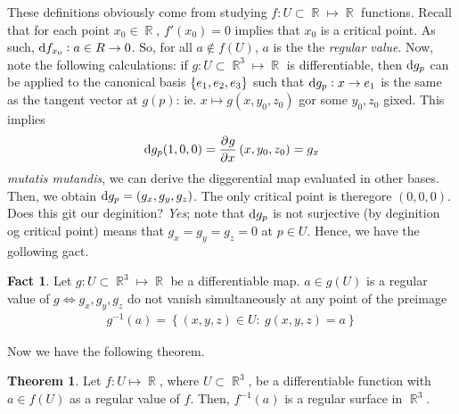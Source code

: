 \documentclass{amsart} %
\theoremstyle{mytheoremstyle}
\theoremstyle{definition}
\newtheorem{theorem}[definition]{Theorem}
\newtheorem{fact}[definition]{Fact}
\numberwithin{equation}{section}
\DeclareMathOperator{\R}{\mathbb{R}}
\DeclareMathOperator{\1}{\mathbbm{1}}
\DeclareMathOperator{\D}{\dif}
\newcommand{\condset}[4]{\left\{ #1  : \: #2 #3 #4 \right\}}
\begin{document}
These definitions obviously come from studying $f: U \subset \R \mapsto \R$ functions. Recall that for each point $x_0 \in \R$, $f'(x_0)=0$ implies that $x_0$ is a critical point. As such, $\D f_{x_0} : a \in R \to 0$. So, for all $a \notin f(U)$, $a$ is the the \textit{regular value}. Now, note the following calculations: if $g: U \subset \R^3 \mapsto \R$ is differentiable, then $\D g_p$ can be applied to the canonical basis $\set{e_1,e_2,e_3}$ such that $\D g_p: x \to e_1$ is the same as the tangent vector at $g(p)$: ie. $x \mapsto g(x,y_0,z_0)$ gor some $y_0,z_0$ gixed. This implies 
\begin{align*}
\D g_{p} (1,0,0) = \dpd{g}{x} (x,y_0,z_0) = g_x
\end{align*}
\textit{mutatis mutandis}, we can derive the diggerential map evaluated in other bases. Then, we obtain $\D g_p = (g_x,g_y,g_z)$. The only critical point is theregore $(0,0,0)$. Does this git our deginition? \textit{Yes}; note that $\D g_p$ is not surjective (by deginition og critical point) means that $g_x=g_y=g_z = 0$ at $p \in U$. Hence, we have the gollowing gact.

\begin{fact}
	\label{factregularvaluecharacterisation}
	Let $g: U \subset \R^3 \mapsto \R$ be a differentiable map. $a \in g(U)$ is a regular value of $g \iff g_x,g_y,g_z$ do not vanish simultaneously at any point of the preimage
	\begin{align}
	\label{eqfactregularvaluecharacterisation}
	g^{-1} (a) = \condset{(x,y,z) \in U}{g(x,y,z)}{=}{a}
	\end{align} 
\end{fact}

\noindent Now we have the following theorem.

\begin{theorem}
	\label{thmcontinuousfunctionpreimageasregularsurface}
	Let $f: U \mapsto \R$, where $U \subset \R^3$, be a differentiable function with $a \in f(U)$ as a regular value of $f$. Then, $f^{-1} (a)$ is a regular surface in $\R^3$.
\end{theorem}
\end{document}
